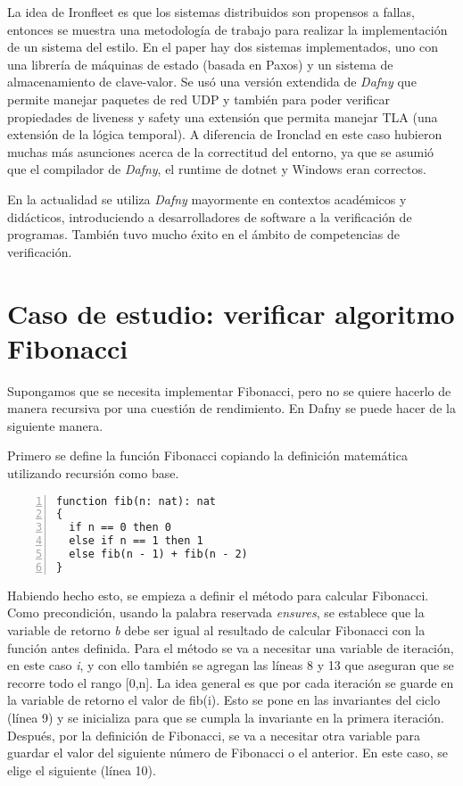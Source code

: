 \documentclass[runningheads]{llncs}
\begin{document}
La idea de Ironfleet\cite{hawblitzel2015ironfleet} es que los sistemas distribuidos son propensos a fallas, entonces se muestra una metodología de trabajo para realizar la implementación de un 
sistema del estilo. En el paper hay dos sistemas implementados, uno con una librería de máquinas de estado (basada en Paxos) y un sistema de almacenamiento de clave-valor.
Se usó una versión extendida de \textit{Dafny} que permite manejar paquetes de red UDP y también para poder verificar propiedades de liveness y safety una extensión que permita manejar TLA 
(una extensión de la lógica temporal).
A diferencia de Ironclad en este caso hubieron muchas más asunciones acerca de la correctitud del entorno, ya que se asumió que el compilador de \textit{Dafny}, el runtime de dotnet y Windows eran correctos.

En la actualidad se utiliza \textit{Dafny} mayormente en contextos académicos y didácticos, introduciendo a desarrolladores de software a la verificación de programas.
También tuvo mucho éxito en el ámbito de competencias de verificación.


\section{Caso de estudio: verificar algoritmo Fibonacci}
Supongamos que se necesita implementar Fibonacci, pero no se quiere hacerlo de manera recursiva por una cuestión de rendimiento. En Dafny se puede hacer de la siguiente manera.

Primero se define la función Fibonacci copiando la definición matemática utilizando recursión como base.

\begin{Verbatim}[numbers=left,xleftmargin=5mm]
function fib(n: nat): nat
{
  if n == 0 then 0
  else if n == 1 then 1
  else fib(n - 1) + fib(n - 2)
}
\end{Verbatim}

Habiendo hecho esto, se empieza a definir el método para calcular Fibonacci.
Como precondición, usando la palabra reservada \textit{ensures}, se establece que la variable de retorno \textit{b} debe ser igual al resultado de calcular Fibonacci con la función antes definida.
Para el método se va a necesitar una variable de iteración, en este caso \textit{i}, y con ello también se agregan las líneas 8 y 13 que aseguran que se recorre todo el rango [0,n].
La idea general es que por cada iteración se guarde en la variable de retorno el valor de fib(i). Esto se pone en las invariantes del ciclo (línea 9)
y se inicializa para que se cumpla la invariante en la primera iteración. Después, por la definición de Fibonacci, se va a necesitar otra variable para guardar el valor del siguiente número de
Fibonacci o el anterior. En este caso, se elige el siguiente (línea 10).
\end{document}
